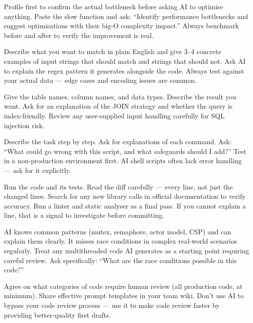 {Profile first to confirm the actual bottleneck before asking AI to optimise anything.
Paste the slow function and ask: ``Identify performance bottlenecks and suggest
optimisations with their big-O complexity impact.''
Always benchmark before and after to verify the improvement is real.}

{Describe what you want to match in plain English and give 3--4 concrete examples
of input strings that should match and strings that should not.
Ask AI to explain the regex pattern it generates alongside the code.
Always test against your actual data --- edge cases and encoding issues are common.}

{Give the table names, column names, and data types.
Describe the result you want.
Ask for an explanation of the JOIN strategy and whether the query is index-friendly.
Review any user-supplied input handling carefully for SQL injection risk.}

{Describe the task step by step.
Ask for explanations of each command.
Ask: ``What could go wrong with this script, and what safeguards should I add?''
Test in a non-production environment first.
AI shell scripts often lack error handling --- ask for it explicitly.}

{Run the code and its tests.
Read the diff carefully --- every line, not just the changed lines.
Search for any new library calls in official documentation to verify accuracy.
Run a linter and static analyser as a final pass.
If you cannot explain a line, that is a signal to investigate before committing.}

{AI knows common patterns (mutex, semaphore, actor model, CSP) and can explain
them clearly.
It misses race conditions in complex real-world scenarios regularly.
Treat any multithreaded code AI generates as a starting point requiring careful review.
Ask specifically: ``What are the race conditions possible in this code?''}

{Agree on what categories of code require human review (all production code, at
minimum).
Share effective prompt templates in your team wiki.
Don't use AI to bypass your code review process --- use it to make code review
faster by providing better-quality first drafts.}

